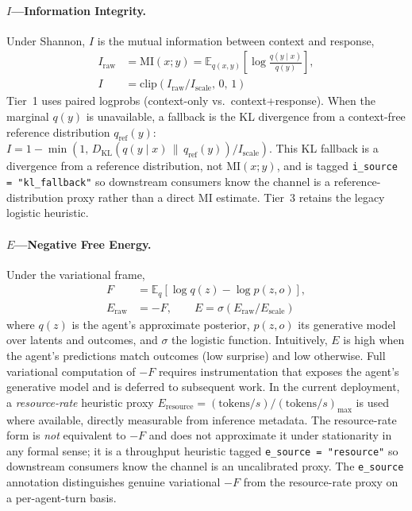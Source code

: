 \documentclass[11pt,twocolumn]{article}
\begin{document}
\paragraph{$I$---Information Integrity.}
Under Shannon, $I$ is the mutual information between context and
response,
\begin{align}
  I_{\text{raw}} &= \mathrm{MI}(x;y) = \mathbb{E}_{q(x,y)}\!\left[\log \tfrac{q(y\mid x)}{q(y)}\right], \nonumber \\
  I &= \mathrm{clip}(I_{\text{raw}} / I_{\text{scale}},\, 0,\, 1)
  \label{eq:I-grounded}
\end{align}
Tier~1 uses paired logprobs (context-only vs.\ context+response).
When the marginal $q(y)$ is unavailable, a fallback is the KL
divergence from a context-free reference
distribution $q_{\text{ref}}(y)$:
$I = 1 - \min(1,\, D_{\mathrm{KL}}(q(y\mid x)\,\|\, q_{\text{ref}}(y)) / I_{\text{scale}})$.
This KL fallback is a divergence from a reference distribution, not
$\mathrm{MI}(x;y)$, and is tagged
\texttt{i\_source = "kl\_fallback"} so downstream consumers know
the channel is a reference-distribution proxy rather than a direct
MI estimate. Tier~3 retains the legacy logistic heuristic.

\paragraph{$E$---Negative Free Energy.}
Under the variational frame,
\begin{align}
  F &= \mathbb{E}_{q}\!\left[\log q(z) - \log p(z,o)\right], \nonumber \\
  E_{\text{raw}} &= -F, \qquad
  E = \sigma(E_{\text{raw}} / E_{\text{scale}})
  \label{eq:E-grounded}
\end{align}
where $q(z)$ is the agent's approximate posterior, $p(z,o)$ its
generative model over latents and outcomes, and $\sigma$ the logistic
function. Intuitively, $E$ is high when the agent's predictions match
outcomes (low surprise) and low otherwise. Full variational
computation of $-F$ requires instrumentation that exposes the
agent's generative model and is deferred to subsequent work. In
the current deployment, a \emph{resource-rate} heuristic proxy
$E_{\text{resource}} = (\text{tokens}/s) / (\text{tokens}/s)_{\max}$
is used where available, directly measurable from inference
metadata. The resource-rate form is \emph{not} equivalent to $-F$
and does not approximate it under stationarity in any formal
sense; it is a throughput heuristic tagged
\texttt{e\_source = "resource"} so downstream consumers know the
channel is an uncalibrated proxy. The \texttt{e\_source}
annotation distinguishes genuine variational $-F$ from the
resource-rate proxy on a per-agent-turn basis.
\end{document}
